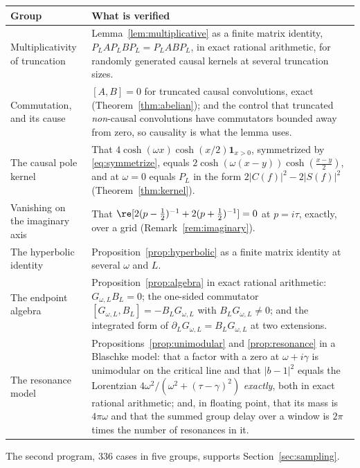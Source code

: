 \begin{center}
\begin{tabular}{@{}p{}p{}@{}}
\toprule
Group & What is verified\\
\midrule
Multiplicativity of truncation &
Lemma~\ref{lem:multiplicative} as a finite matrix identity,
$P_LAP_LBP_L=P_LABP_L$, in exact rational arithmetic, for randomly generated
causal kernels at several truncation sizes.\\
Commutation, and its cause &
$[A,B]=0$ for truncated causal convolutions, exact
(Theorem~\ref{thm:abelian}); and the control that truncated \emph{non}-causal
convolutions have commutators bounded away from zero, so causality is what the
lemma uses.\\
The causal pole kernel &
That $4\cosh(\omega x)\cosh(x/2)\mathbf1_{x>0}$, symmetrized by
\eqref{eq:symmetrize}, equals $2\cosh(\omega(x-y))\cosh(\frac{x-y}2)$, and at
$\omega=0$ equals $P_L$ in the form $2|C(f)|^2-2|S(f)|^2$
(Theorem~\ref{thm:kernel}).\\
Vanishing on the imaginary axis &
That $\re[2(p-\frac12)^{-1}+2(p+\frac12)^{-1}]=0$ at $p=i\tau$, exactly, over a
grid (Remark~\ref{rem:imaginary}).\\
The hyperbolic identity &
Proposition~\ref{prop:hyperbolic} as a finite matrix identity at several
$\omega$ and $L$.\\
The endpoint algebra &
Proposition~\ref{prop:algebra} in exact rational arithmetic: $G_{\omega,L}B_L=0$;
the one-sided commutator $[G_{\omega,L},B_L]=-B_LG_{\omega,L}$ with
$B_LG_{\omega,L}\neq0$; and the integrated form of
$\partial_LG_{\omega,L}=B_LG_{\omega,L}$ at two extensions.\\
The resonance model &
Propositions~\ref{prop:unimodular} and \ref{prop:resonance} in a Blaschke model:
that a factor with a zero at $\omega+i\gamma$ is unimodular on the critical line
and that $|b-1|^2$ equals the Lorentzian $4\omega^2/(\omega^2+(\tau-\gamma)^2)$
\emph{exactly}, both in exact rational arithmetic; and, in floating point, that
its mass is $4\pi\omega$ and that the summed group delay over a window is $2\pi$
times the number of resonances in it.\\
\bottomrule
\end{tabular}
\end{center}

The second program, $336$ cases in five groups, supports
Section~\ref{sec:sampling}.

